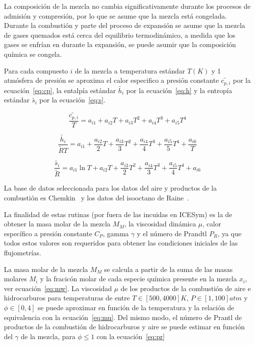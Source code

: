 La composición de la mezcla no cambia significativamente durante los procesos de
admisión y compresión, por lo que se asume que la mezcla está congelada.
%
Durante la combustión y parte del proceso de expansión se asume que la mezcla de
gases quemados está cerca del equilibrio termodinámico, a medida que los gases
se enfrían en durante la expansión, se puede asumir que la composición química
se congela.

Para cada compuesto $i$ de la mezcla a temperatura estándar $T(K)$ y 1 atmósfera
de presión se aproxima el calor especifico a presión constante
$\widetilde{c_{p,i}}$ por la ecuación~\ref{eq:cp}, la entalpía estándar
$\widetilde{h_{i}}$ por la ecuación~\ref{eq:h} y la entropía estándar
$\widetilde{s_{i}}$ por la ecuación~\ref{eq:s}.

\begin{equation}\label{eq:cp} \frac{\widetilde{c_{p,i}}}{T} = a_{i1} + a_{i2}T + a_{i3}T^{2} + a_{i4}T^{3} + a_{i5}T^{4}
\end{equation}

\begin{equation}\label{eq:h} \frac{\widetilde{h_{i}}}{\widetilde{R}T} = a_{i1} + \frac{a_{i2}}{2}T + \frac{a_{i3}}{3}T^{2} + \frac{a_{i4}}{4}T^{3} + \frac{a_{i5}}{5}T^{4} +\frac{a_{i6}}{T}
\end{equation}


\begin{equation}\label{eq:s} \frac{\widetilde{s_{i}}}{\widetilde{R}} = a_{i1} \ln{T} + a_{i2}T + \frac{a_{i3}}{2}T^{2} + \frac{a_{i4}}{3}T^{3} + \frac{a_{i5}}{4}T^{4} + a_{i6}
\end{equation}

La base de datos seleccionada para los datos del aire y productos de la
combustión es Chemkin~\parencite{chemkin} y los datos del isooctano de
Raine~\parencite{raine}.

La finalidad de estas rutinas (por fuera de las incuidas en ICESym) es la de
obtener la masa molar de la mezcla $M_{M}$, la viscosidad dinámica $\mu$, calor
específico a presión constante $C_{P}$, gamma $\gamma$ y el número de Prandtl
$P_{R}$, ya que todos estos valores son requeridos para obtener las condiciones
iniciales de las flujometrías.

La masa molar de la mezcla $M_{M}$ se calcula a partir de la suma de las masas
molares $M_{i}$ y la fracicón molar de cada especie química presente en la
mezcla $x_{i}$, ver ecuación~\ref{eq:mw}.
%
La viscosidad $\mu$ de los productos de la combustión de aire e hidrocarburos
para temperaturas de entre $T\in [500, 4000]K$, $P\in[1, 100]atm$ y
$\phi \in [0,4]$ se puede aproximar en función de la temperatura y la relación
de equivalencia con la ecuación~\ref{eq:mu}.
%
Del mismo modo, el número de Prantl de productos de la combustión de
hidrocarburos y aire se puede estimar en función del $\gamma$ de la mezcla, para
$\phi\leq 1$ con la  ecuación~\ref{eq:pr}

